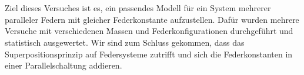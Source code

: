 \section*{\abstractname}
\label{sec:zusammenfassung}


Ziel dieses Versuches ist es, ein passendes Modell für ein System mehrerer paralleler Federn mit gleicher Federkonstante aufzustellen. Dafür wurden mehrere Versuche mit verschiedenen Massen und Federkonfigurationen durchgeführt und statistisch ausgewertet. Wir sind zum Schluss gekommen, dass das Superpositionsprinzip auf Federsysteme zutrifft und sich die Federkonstanten in einer Parallelschaltung addieren.

\vspace{3cm}
